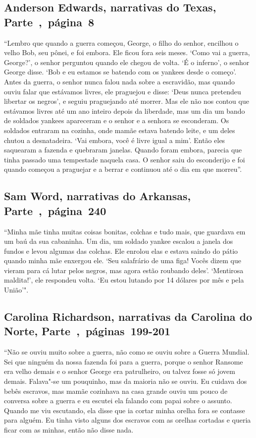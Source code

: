 \subsection{Anderson Edwards, narrativas do Texas, Parte~,~página~8} \label{ref81}

``Lembro que quando a guerra começou, George, o filho do senhor,
encilhou o velho Bob, seu pônei, e foi embora. Ele ficou fora seis
meses. `Como vai a guerra, George?', o senhor perguntou quando ele
chegou de volta. `É o inferno', o senhor George disse. `Bob e eu estamos
se batendo com os yankees desde o começo'. Antes da guerra, o senhor
nunca falou nada sobre a escravidão, mas quando ouviu falar que
estávamos livres, ele praguejou e disse: `Deus nunca pretendeu libertar
os negros', e seguiu praguejando até morrer. Mas ele não nos contou que
estávamos livres até um ano inteiro depois da liberdade, mas um dia um
bando de soldados yankees apareceram e o senhor e a senhora se
esconderam. Os soldados entraram na cozinha, onde mamãe estava batendo
leite, e um deles chutou a desnatadeira. `Vai embora, você é livre igual
a mim'. Então eles saquearam a fazenda e quebraram janelas. Quando foram
embora, parecia que tinha passado uma tempestade naquela casa. O senhor
saiu do esconderijo e foi quando começou a praguejar e a berrar e
continuou até o dia em que morreu''.

\subsection{Sam Word, narrativas do Arkansas, Parte~,~página~240}
\label{ref315}

``Minha mãe tinha muitas coisas bonitas, colchas e tudo mais, que
guardava em um baú da sua cabaninha. Um dia, um soldado yankee escalou a
janela dos fundos e levou algumas das colchas. Ele enrolou elas e estava
saindo do pátio quando minha mãe enxergou ele. `Seu salafrário de uma
figa! Vocês dizem que vieram para cá lutar pelos negros, mas agora estão
roubando deles'. `Mentirosa maldita!', ele respondeu volta. `Eu estou
lutando por 14 dólares por mês e pela União'".

\subsection{Carolina Richardson, narrativas da Carolina do Norte, Parte~,~páginas~199-201} \label{ref225}

``Não se ouviu muito sobre a guerra, não como se ouviu sobre a Guerra
Mundial. Sei que ninguém da nossa fazenda foi para a guerra, porque o
senhor Ransome era velho demais e o senhor George era patrulheiro, ou
talvez fosse só jovem demais. Falava"-se um pouquinho, mas da maioria não
se ouviu. Eu cuidava dos bebês escravos, mas mamãe cozinhava na casa
grande ouviu um pouco de conversa sobre a guerra e eu escutei ela
falando com papai sobre o assunto. Quando me viu escutando, ela disse
que ia cortar minha orelha fora se contasse para alguém. Eu tinha visto
alguns dos escravos com as orelhas cortadas e queria ficar com as
minhas, então não disse nada.

